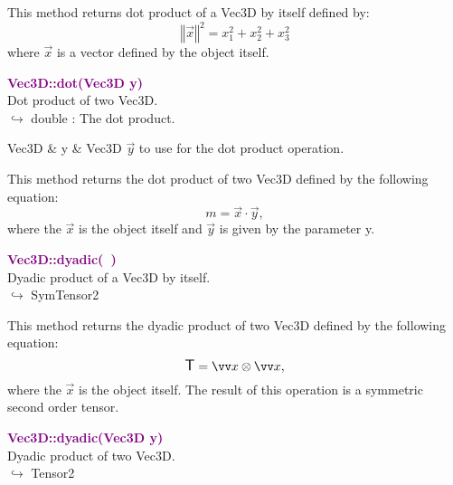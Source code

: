 This method returns dot product of a Vec3D by itself defined by:
\begin{equation*}
\left\Vert \overrightarrow{x} \right\Vert^2  = x_{1}^2 + x_{2}^2 + x_{3}^2
\end{equation*}
where $\overrightarrow{x}$ is a vector defined by the object itself.

\textcolor{purple}{\textbf{Vec3D::dot(Vec3D y)}}\label{Vec3D::dot(Vec3D y)}\\
Dot product of two Vec3D.\\ \hspace*{10mm}$\hookrightarrow$ double : The dot product.

\begin{tcolorbox}[width=\textwidth,myArgs,tabularx={ll|R}]
Vec3D & y & Vec3D $\overrightarrow{y}$ to use for the dot product operation.
\end{tcolorbox}

This method returns the dot product of two Vec3D defined by the following equation:
\begin{equation*}
m = \overrightarrow{x}\cdot\overrightarrow{y},
\end{equation*}
where the $\overrightarrow{x}$ is the object itself and $\overrightarrow{y}$ is given by the parameter y.

\textcolor{purple}{\textbf{Vec3D::dyadic(~)}}\label{Vec3D::dyadic()}\\
Dyadic product of a Vec3D by itself.\\ \hspace*{10mm}$\hookrightarrow$ SymTensor2

This method returns the dyadic product of two Vec3D defined by the following equation:
\begin{equation*}
\T = \overrightarrow{x}\otimes\overrightarrow{x},
\end{equation*}
where the $\overrightarrow{x}$ is the object itself. The result of this operation is a symmetric second order tensor.

\textcolor{purple}{\textbf{Vec3D::dyadic(Vec3D y)}}\label{Vec3D::dyadic(Vec3D y)}\\
Dyadic product of two Vec3D.\\ \hspace*{10mm}$\hookrightarrow$ Tensor2

